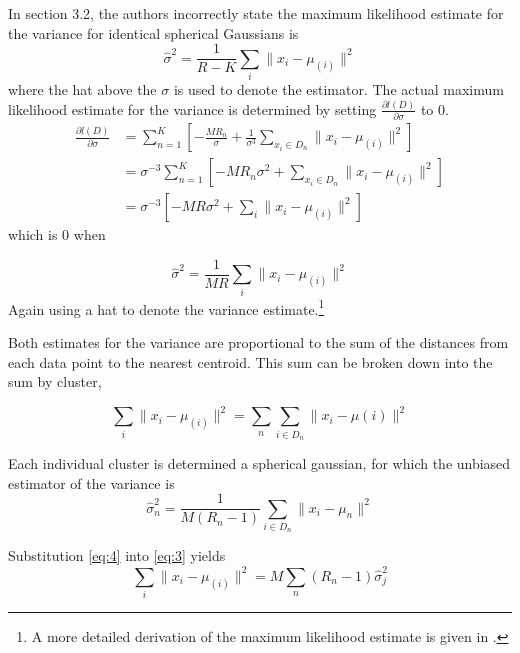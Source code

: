 \documentclass[letterpaper]{article}
\begin{document}
In \cite{Pelleg2000} section 3.2, the authors incorrectly state the
maximum likelihood estimate for the variance for identical spherical
Gaussians is 
\begin{equation}
  \label{eq:20}
  \hat{\sigma}^2 = \frac{1}{R-K}\sum_{i} \| x_i - \mu_{(i)} \|^2
\end{equation}
where the hat above the $\sigma$ is used to denote the estimator.  The
actual maximum likelihood estimate for the variance is determined by
setting $\frac{\partial l(D)}{\partial \sigma}$ to 0.
\begin{align}
  \frac{\partial l(D)}{\partial \sigma} 
    &= \sum_{n=1}^K \left[ - \frac{M R_n}{\sigma}
       + \frac{1}{\sigma^3} \sum_{x_i \in D_n} \|x_i - \mu_{(i)}\|^2 \right] \nonumber \\
    &= \sigma^{-3} \sum_{n=1}^K \left[ -M R_n\sigma^2
       + \sum_{x_i \in D_n} \|x_i - \mu_{(i)}\|^2 \right] \nonumber \\
  \label{eq:21}
    &= \sigma^{-3} \left[ -M R \sigma^2
       + \sum_i \|x_i - \mu_{(i)}\|^2 \right]
\end{align}
which is 0 when

\begin{equation}
  \label{eq:19}
  \hat{\sigma}^2 = \frac{1}{M R} \sum_{i} \|x_i - \mu_{(i)} \|^2
\end{equation}
Again using a hat to denote the variance estimate.\footnote{A more
  detailed derivation of the maximum likelihood estimate is given in
  \cite{DaumeIII2009}.}

Both estimates for the variance are proportional to the sum of the distances
from each data point to the nearest centroid.  This sum can be broken
down into the sum by cluster,

\begin{equation}
  \label{eq:3}
  \sum_i \|x_i - \mu_{(i)}\|^2 = \sum_n \sum_{i \in D_n} \|x_i - \mu{(i)} \|^2
\end{equation}

Each individual cluster is determined a spherical gaussian, for which
the unbiased estimator of the variance is
\begin{equation}
  \label{eq:4}
  \hat{\sigma}_n^2 = \frac{1}{M(R_n-1)}\sum_{i \in D_n} \| x_i - \mu_n \|^2
\end{equation}

Substitution \eqref{eq:4} into \eqref{eq:3} yields
\begin{equation}
  \label{eq:5}
  \sum_i \|x_i - \mu_{(i)}\|^2 = M \sum_n \left(R_n-1 \right) \hat\sigma_j^2
\end{equation}
\end{document}
